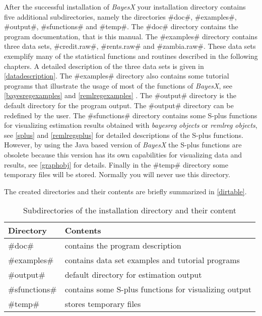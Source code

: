After the successful installation of {\em BayesX} your
installation directory contains five additional subdirectories,
namely the directories #doc#, #examples#, #output#,
#sfunctions# and #temp#. The #doc# directory contains
the program documentation, that is this manual. The #examples#
directory contains three data sets, #credit.raw#, #rents.raw#
and #zambia.raw#. These data sets exemplify many of the
statistical functions and routines described in the following
chapters. A detailed description of the three data sets is given
in \autoref{datadescription}. The #examples# directory also contains
some tutorial programs that illustrate the usage of most of the
functions of {\em BayesX}, see \autoref{bayesregexamples} and
\autoref{remlregexamples} . The #output# directory is the
default directory for the program output. The #output# directory can
be redefined by the user. The #sfunctions# directory contains
some S-plus functions for visualizing estimation results obtained
with {\em bayesreg objects} or {\em remlreg objects}, see
\autoref{splus} and \autoref{remlregsplus} for detailed
descriptions of the S-plus functions. However, by using the Java
based version of {\em BayesX} the S-plus functions are obsolete
because this version has its own capabilities for visualizing data
and results, see \autoref{graphobj} for details.
 Finally in the #temp#
directory some temporary files will be stored. Normally you will
never use this directory.

The created directories and their contents are briefly summarized
in \autoref{dirtable}.

\begin{table}[ht]
\begin{center}
\begin{tabular}{|l|l|}
\hline
Directory & Contents \\
\hline
#doc# & contains the program description \\
#examples# & contains data set examples and tutorial programs \\
#output# & default directory for estimation output \\
#sfunctions# & contains some S-plus functions for visualizing output \\
#temp# & stores temporary files \\
\hline
\end{tabular}
{\em\caption{ \label{dirtable} Subdirectories of the installation
directory and their content}}
\end{center}
\end{table}

